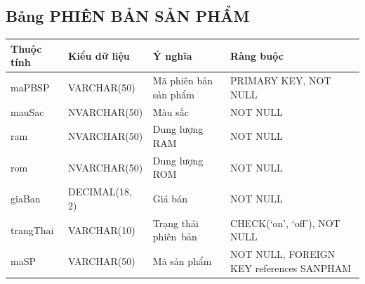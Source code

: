 \documentclass[a4paper,12pt]{report}
\begin{document}
\subsection{Bảng PHIÊN BẢN SẢN PHẨM}
\noindent
\begin{center}
    \begin{longtable}{|>{\centering\arraybackslash}p{3cm}|
        >{\centering\arraybackslash}p{4cm}|
        >{\centering\arraybackslash}p{4cm}|
        >{\centering\arraybackslash}p{4cm}|}
        \hline
        \textbf{Thuộc tính}                                                                                                               &
        \textbf{Kiểu dữ liệu}                                                                                                                             &
        \textbf{Ý nghĩa}                                                                                                 &
        \textbf{Ràng buộc}                                                                                                         \\
        \hline
        maPBSP &  VARCHAR(50)  & Mã phiên bản sản phẩm & PRIMARY KEY, NOT NULL \\
        \hline
        mauSac &  NVARCHAR(50)  & Màu sắc & NOT NULL \\                                                                                                                          
        \hline
        ram & NVARCHAR(50) & Dung lượng RAM & NOT NULL \\                                                                                                                          
        \hline
        rom & NVARCHAR(50) & Dung lượng ROM & NOT NULL \\                                                                                                                          
        \hline
        giaBan & DECIMAL(18, 2) & Giá bán & NOT NULL \\                                                                                                                          
        \hline
        trangThai &  VARCHAR(10)  & Trạng thái phiên~bản & CHECK(‘on’, ‘off’), NOT NULL \\
        \hline
        maSP & VARCHAR(50) & Mã sản phẩm & NOT NULL, FOREIGN KEY references SANPHAM \\                                                                                                                          
        \hline
    \end{longtable}
\end{center}
\end{document}
